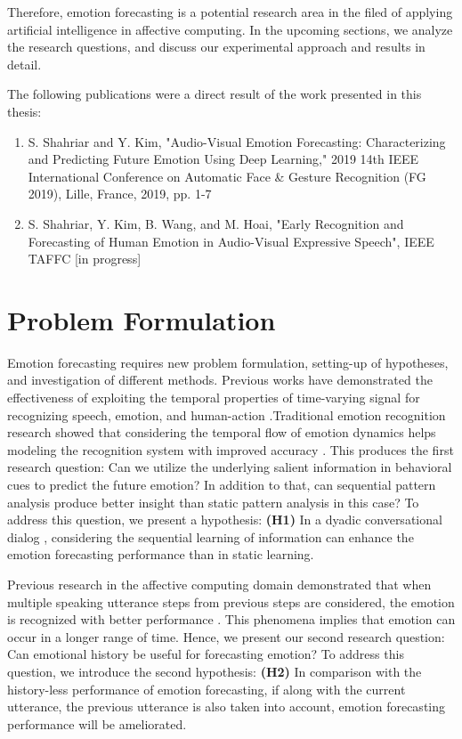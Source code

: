Therefore, emotion forecasting is a potential research area in the filed of applying artificial intelligence in affective computing. In the upcoming sections, we analyze the research questions, and discuss our experimental approach and results in detail. 

The following publications were a direct result of the work presented in this thesis:
\begin{enumerate}
\item S. Shahriar and Y. Kim, "Audio-Visual Emotion Forecasting: Characterizing and Predicting Future Emotion Using Deep Learning," 2019 14th IEEE International Conference on Automatic Face \& Gesture Recognition (FG 2019), Lille, France, 2019, pp. 1-7
\item S. Shahriar, Y. Kim, B. Wang, and M. Hoai, "Early Recognition and Forecasting of Human Emotion in Audio-Visual Expressive Speech", IEEE TAFFC [in progress]
 
\end{enumerate}

\newpage
\section{Problem Formulation}
Emotion forecasting requires new problem formulation, setting-up of hypotheses, and investigation of different methods. Previous works have demonstrated the effectiveness of exploiting the temporal properties of time-varying signal for recognizing speech, emotion, and human-action \cite{speech_rec,baltru,action}.Traditional emotion recognition research showed that considering the temporal flow of emotion dynamics helps modeling the recognition system with improved accuracy \cite{kim_icassp_2013,Meta}.
This produces the first research question: Can we utilize the underlying salient information in behavioral cues to predict the future emotion? In addition to that, can sequential pattern analysis produce better insight than static pattern analysis in this case? To address this question, we present a hypothesis: \textbf{(H1)} In a dyadic conversational dialog , considering the sequential learning of information can enhance the emotion forecasting performance than in static learning. 

Previous research in the affective computing domain demonstrated that when multiple speaking utterance steps from previous steps are considered, the emotion is recognized with better performance \cite{Meta2}. This phenomena implies that emotion can occur in a longer range of time. Hence, we present our second research question: Can emotional history be useful for forecasting emotion? To address this question, we introduce the second hypothesis: \textbf{(H2)} In comparison with the history-less performance of emotion forecasting, if along with the current utterance, the previous utterance is also taken into account, emotion forecasting performance will be ameliorated.

